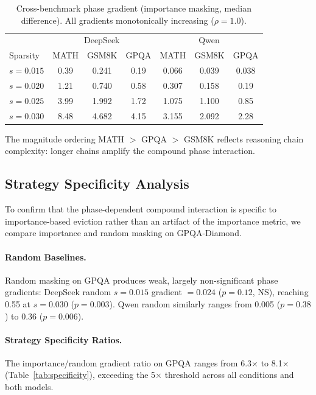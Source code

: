 \documentclass[11pt]{article}
\begin{document}
\begin{table}[h]
\centering
\caption{Cross-benchmark phase gradient (importance masking, median difference). All gradients monotonically increasing ($\rho=1.0$).}
\label{tab:gpqa_cross_benchmark}
\begin{tabular}{lccc|ccc}
\toprule
& \multicolumn{3}{c}{DeepSeek} & \multicolumn{3}{c}{Qwen} \\
Sparsity & MATH & GSM8K & GPQA & MATH & GSM8K & GPQA \\
\midrule
$s=0.015$ & 0.39 & 0.241 & 0.19 & 0.066 & 0.039 & 0.038 \\
$s=0.020$ & 1.21 & 0.740 & 0.58 & 0.307 & 0.158 & 0.19 \\
$s=0.025$ & 3.99 & 1.992 & 1.72 & 1.075 & 1.100 & 0.85 \\
$s=0.030$ & 8.48 & 4.682 & 4.15 & 3.155 & 2.092 & 2.28 \\
\bottomrule
\end{tabular}
\end{table}

The magnitude ordering MATH $>$ GPQA $>$ GSM8K reflects reasoning chain complexity: longer chains amplify the compound phase interaction.

\subsection{Strategy Specificity Analysis}
\label{sec:specificity}

To confirm that the phase-dependent compound interaction is specific to importance-based eviction rather than an artifact of the importance metric, we compare importance and random masking on GPQA-Diamond.

\paragraph{Random Baselines.}
Random masking on GPQA produces weak, largely non-significant phase gradients: DeepSeek random $s=0.015$ gradient $=0.024$ ($p=0.12$, NS), reaching 0.55 at $s=0.030$ ($p=0.003$). Qwen random similarly ranges from 0.005 ($p=0.38$) to 0.36 ($p=0.006$).

\paragraph{Strategy Specificity Ratios.}
The importance/random gradient ratio on GPQA ranges from 6.3$\times$ to 8.1$\times$ (Table~\ref{tab:specificity}), exceeding the 5$\times$ threshold across all conditions and both models.
\end{document}
